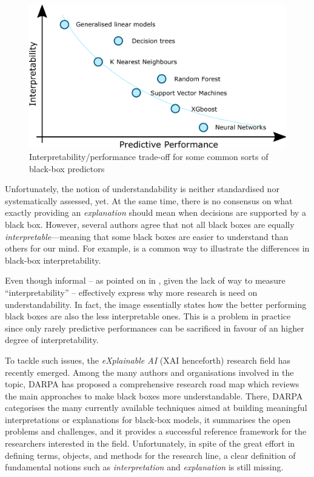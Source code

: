 \documentclass[12pt,a4paper,openright,twoside]{book}
\begin{document}
\begin{figure}
	\centering
	\includegraphics[width=.5\linewidth]{figures/interpretability-performance-tradeoff}
	\caption{Interpretability/performance trade-off for some common sorts of black-box predictors}
	\label{fig:tradeoff}
\end{figure}

Unfortunately, the notion of understandability is neither standardised nor systematically assessed, yet.
%
At the same time, there is no consensus on what exactly providing an \emph{explanation} should mean when decisions are supported by a black box.
%
However, several authors agree that not all black boxes are equally \emph{interpretable}---meaning that some black boxes are easier to understand than others for our mind.
%
For example,  is a common way to illustrate the differences in black-box interpretability.

Even though informal -- as pointed on in \cite{Rudin2019}, given the lack of way to measure ``interpretability'' --  effectively express why more research is need on understandability.
%
In fact, the image essentially states how the better performing black boxes are also the less interpretable ones.
%
This is a problem in practice since only rarely predictive performances can be sacrificed in favour of an higher degree of interpretability.

To tackle such issues, the \emph{eXplainable AI} (XAI henceforth) research field has recently emerged.
%
Among the many authors and organisations involved in the topic, DARPA has proposed a comprehensive research road map \cite{darpa2016-xai} which reviews the main approaches to make black boxes more understandable.
%
There, DARPA categorises the many currently available techniques aimed at building meaningful interpretations or explanations for black-box models, it summarises the open problems and challenges, and it provides a successful reference framework for the researchers interested in the field.
%
Unfortunately, in spite of the great effort in defining terms, objects, and methods for the research line, a clear definition of fundamental notions such as \emph{interpretation} and \emph{explanation} is still missing.
\end{document}
